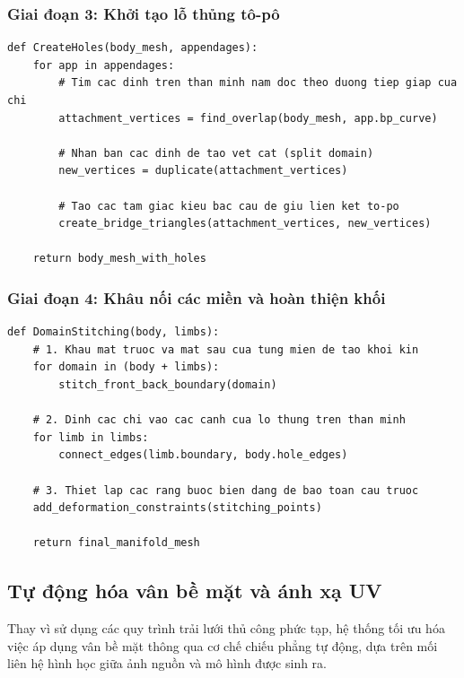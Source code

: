 \documentclass{report}
\newenvironment{graycode}
{\begin{mdframed}[backgroundcolor=light-gray, linecolor=light-gray, roundcorner=5pt]}
{\end{mdframed}}
\begin{document}
\subsubsection{Giai đoạn 3: Khởi tạo lỗ thủng tô-pô}
\begin{graycode}
\begin{lstlisting}[caption=Mã giả tạo lỗ thủng trên lưới]
def CreateHoles(body_mesh, appendages):
    for app in appendages:
        # Tim cac dinh tren than minh nam doc theo duong tiep giap cua chi
        attachment_vertices = find_overlap(body_mesh, app.bp_curve)
        
        # Nhan ban cac dinh de tao vet cat (split domain)
        new_vertices = duplicate(attachment_vertices)
        
        # Tao cac tam giac kieu bac cau de giu lien ket to-po
        create_bridge_triangles(attachment_vertices, new_vertices)
        
    return body_mesh_with_holes
\end{lstlisting}
\end{graycode}

\subsubsection{Giai đoạn 4: Khâu nối các miền và hoàn thiện khối}
\begin{graycode}
\begin{lstlisting}[caption=Mã giả khâu nối toàn cục]
def DomainStitching(body, limbs):
    # 1. Khau mat truoc va mat sau cua tung mien de tao khoi kin
    for domain in (body + limbs):
        stitch_front_back_boundary(domain)
        
    # 2. Dinh cac chi vao cac canh cua lo thung tren than minh
    for limb in limbs:
        connect_edges(limb.boundary, body.hole_edges)
        
    # 3. Thiet lap cac rang buoc bien dang de bao toan cau truoc
    add_deformation_constraints(stitching_points)
    
    return final_manifold_mesh
\end{lstlisting}
\end{graycode}

\subsection{Tự động hóa vân bề mặt và ánh xạ UV}

Thay vì sử dụng các quy trình trải lưới thủ công phức tạp, hệ thống tối ưu hóa việc áp dụng vân bề mặt thông qua cơ chế chiếu phẳng tự động, dựa trên mối liên hệ hình học giữa ảnh nguồn và mô hình được sinh ra.
\end{document}
